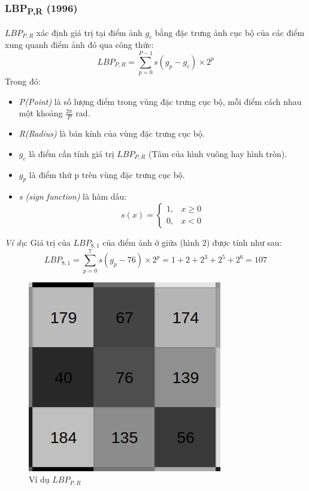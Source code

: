 \subsubsection{LBP\textsubscript{P,R} (1996)}

$LBP_{P,R}$ xác định giá trị tại điểm ảnh $g_c$ bằng đặc trưng ảnh cục bộ của các điểm xung quanh điểm ảnh đó qua công thức:
\begin{equation}
	LBP_{P,R} = \sum^{P-1}_{p=0}{s(g_p-g_c)\times 2^p}
\end{equation}
Trong đó:
\begin{itemize}
	\item \textit{P(Point)} là số lượng điểm trong vùng đặc trưng cục bộ, mỗi điểm cách nhau một khoảng $\frac{2\pi}{P}$ rad.
	\item \textit{R(Radius)} là bán kính của vùng đặc trưng cục bộ.
	\item $g_c$ là điểm cần tính giá trị $LBP_{P,R}$ (Tâm của hình vuông hay hình tròn).
	\item $g_p$ là điểm thứ p trên vùng đặc trưng cục bộ.
	\item \textit{s (sign function)} là hàm dấu:
		\begin{equation}
			s(x) = \begin{cases}
				1, & x \geq 0\\
				0, & x < 0
			\end{cases}
		\end{equation}
\end{itemize}

\textit{Ví dụ}: Giá trị của $LBP_{8,1}$ của điểm ảnh ở giữa (hình 2) được tính như sau:
$$
	LBP_{8,1} = \sum^{7}_{p=0}{s(g_p-76)\times 2^p} = 1 + 2 +2^3 + 2^5 + 2^6 = 107
$$

\begin{figure}[H]
	\begin{center}
		\includegraphics[scale=0.5]{images/theo1/LBP_exam1}
		\caption{Ví dụ $LBP_{P,R}$}
	\end{center}
\end{figure}
\pagebreak

